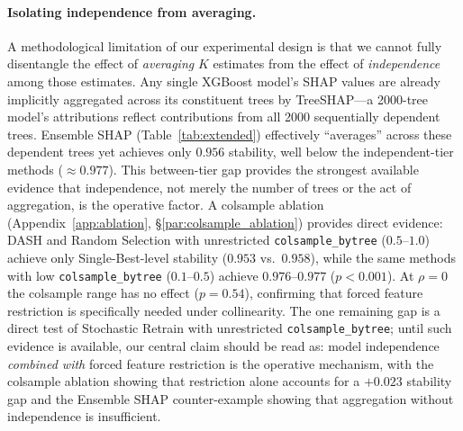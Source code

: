 \documentclass[11pt]{article}
\newcommand{\dash}{\textsc{DASH}}
\newcommand{\rhovar}{\rho}
\begin{document}
\paragraph{Isolating independence from averaging.}
A methodological limitation of our experimental design is that we cannot
fully disentangle the effect of \emph{averaging} $K$ estimates from the
effect of \emph{independence} among those estimates.  Any single
XGBoost model's SHAP values are already implicitly aggregated across
its constituent trees by TreeSHAP---a 2000-tree model's attributions
reflect contributions from all 2000 sequentially dependent trees.
Ensemble SHAP (Table~\ref{tab:extended}) effectively ``averages'' across
these dependent trees yet achieves only $0.956$ stability, well below the
independent-tier methods ($\approx 0.977$).  This between-tier gap
provides the strongest available evidence that independence, not merely
the number of trees or the act of aggregation, is the operative factor.
A colsample ablation (Appendix~\ref{app:ablation},
\S\ref{par:colsample_ablation}) provides direct evidence: \dash{} and
Random Selection with unrestricted \texttt{colsample\_bytree}
($0.5$--$1.0$) achieve only Single-Best-level stability ($0.953$ vs.\
$0.958$), while the same methods with low \texttt{colsample\_bytree}
($0.1$--$0.5$) achieve $0.976$--$0.977$ ($p < 0.001$).  At
$\rhovar = 0$ the colsample range has no effect ($p = 0.54$), confirming
that forced feature restriction is specifically needed under collinearity.
The one remaining gap is a direct test of Stochastic Retrain with
unrestricted \texttt{colsample\_bytree}; until such evidence is
available, our central claim should be read as: model independence
\emph{combined with} forced feature restriction is the operative
mechanism, with the colsample ablation showing that restriction alone
accounts for a $+0.023$ stability gap and the Ensemble SHAP
counter-example showing that aggregation without independence is
insufficient.
\end{document}
